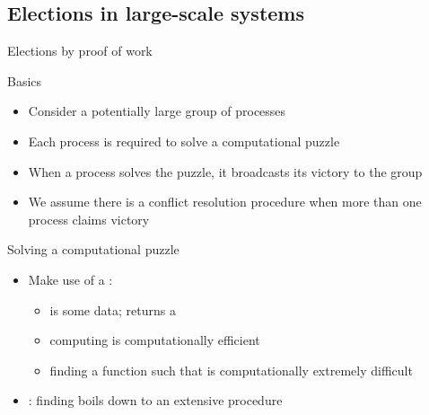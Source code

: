 \subsection{Elections in large-scale systems}
\begin{frame}{Elections by proof of work}
  \begin{block}{Basics}
    \begin{itemize}\firmlist
      \item Consider a potentially large group of processes
      \item Each process is required to solve a computational puzzle
      \item When a process solves the puzzle, it broadcasts its victory to the group
      \item We assume there is a conflict resolution procedure when more than one process claims victory
    \end{itemize}
  \end{block}
  \begin{block}{Solving a computational puzzle}
    \begin{itemize}
      \item Make use of a  :
            \begin{itemize}
              \item {} is some data;  returns a 
              \item computing  is computationally efficient
              \item finding a function  such that  is computationally
                    extremely difficult
            \end{itemize}
      \item {}: finding  boils down to an extensive 
            procedure
    \end{itemize}
  \end{block}
\end{frame}
